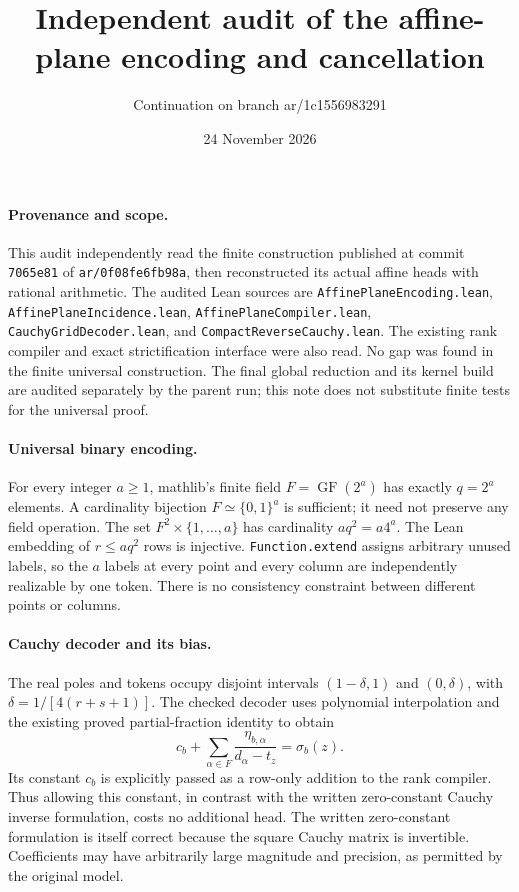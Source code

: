 \documentclass[11pt]{article}
\begin{document}
\title{Independent audit of the affine-plane encoding and cancellation}
\author{Continuation on branch ar/1c1556983291}
\date{24 November 2026}
\maketitle

\paragraph{Provenance and scope.}
This audit independently read the finite construction published at commit
\texttt{7065e81} of \texttt{ar/0f08fe6fb98a}, then reconstructed its actual
affine heads with rational arithmetic. The audited Lean sources are
\texttt{AffinePlaneEncoding.lean}, \texttt{AffinePlaneIncidence.lean},
\texttt{AffinePlaneCompiler.lean}, \texttt{CauchyGridDecoder.lean}, and
\texttt{CompactReverseCauchy.lean}. The existing rank compiler and exact
strictification interface were also read. No gap was found in the finite
universal construction. The final global reduction and its kernel build are
audited separately by the parent run; this note does not substitute finite
tests for the universal proof.

\paragraph{Universal binary encoding.}
For every integer $a\geq1$, mathlib's finite field
$F=\operatorname{GF}(2^a)$ has exactly $q=2^a$ elements. A cardinality
bijection $F\simeq\{0,1\}^{a}$ is sufficient; it need not preserve any
field operation. The set $F^2\times\{1,\ldots,a\}$ has cardinality
$aq^2=a4^a$. The Lean embedding of $r\leq aq^2$ rows is injective.
\texttt{Function.extend} assigns arbitrary unused labels, so the $a$ labels
at every point and every column are independently realizable by one token.
There is no consistency constraint between different points or columns.

\paragraph{Cauchy decoder and its bias.}
The real poles and tokens occupy disjoint intervals
$(1-\delta,1)$ and $(0,\delta)$, with
$\delta=1/[4(r+s+1)]$. The checked decoder uses polynomial interpolation
and the existing proved partial-fraction identity to obtain
\[
 c_b+\sum_{\alpha\in F}
 \frac{\eta_{b,\alpha}}{d_\alpha-t_z}=\sigma_b(z).
\]
Its constant $c_b$ is explicitly passed as a row-only addition to the rank
compiler. Thus allowing this constant, in contrast with the written
zero-constant Cauchy inverse formulation, costs no additional head.
The written zero-constant formulation is itself correct because the square
Cauchy matrix is invertible. Coefficients may have arbitrarily large
magnitude and precision, as permitted by the original model.
\end{document}
